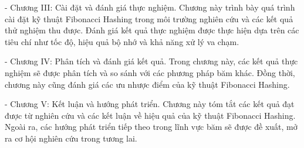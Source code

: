 \documentclass[12pt,a4paper]{report}
\begin{document}
- Chương III: Cài đặt và đánh giá thực nghiệm. Chương này trình bày quá trình cài đặt kỹ thuật Fibonacci Hashing trong môi trường nghiên cứu và các kết quả thử nghiệm thu được. Đánh giá kết quả thực nghiệm được thực hiện dựa trên các tiêu chí như tốc độ, hiệu quả bộ nhớ và khả năng xử lý va chạm.

- Chương IV: Phân tích và đánh giá kết quả. Trong chương này, các kết quả thực nghiệm sẽ được phân tích và so sánh với các phương pháp băm khác. Đồng thời, chương này cũng đánh giá các ưu nhược điểm của kỹ thuật Fibonacci Hashing.

- Chương V: Kết luận và hướng phát triển. Chương này tóm tắt các kết quả đạt được từ nghiên cứu và các kết luận về hiệu quả của kỹ thuật Fibonacci Hashing. Ngoài ra, các hướng phát triển tiếp theo trong lĩnh vực băm sẽ được đề xuất, mở ra cơ hội nghiên cứu trong tương lai.
\end{document}
